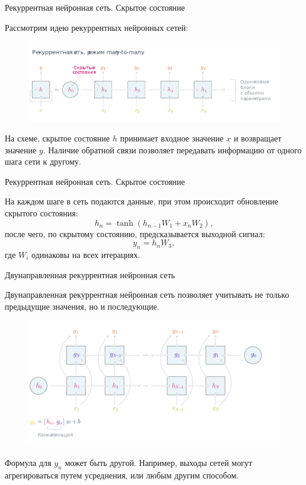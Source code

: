 \documentclass[notheorems, handout, 10pt]{beamer}
\begin{document}
	\begin{frame}{Рекуррентная нейронная сеть. Скрытое состояние}
		
		Рассмотрим идею рекуррентных нейронных сетей:
		
		\begin{figure}[H]
			\includegraphics[width=1\linewidth]{images/3}
		\end{figure}
		
		На схеме, скрытое состояние $h$ принимает входное значение $x$ и возвращает значение $y$. Наличие обратной связи позволяет передавать информацию от одного шага сети к другому.
		
		\note{}
		
	\end{frame}
	\begin{frame}{Рекуррентная нейронная сеть. Скрытое состояние}
	
		На каждом шаге в сеть подаются данные, при этом происходит обновление скрытого состояния: $$h_n = \tanh(h_{n-1}W_1 + x_nW_2),$$ после чего, по скрытому состоянию, предсказывается выходной сигнал: $$y_n=h_nW_3,$$ где $W_i$ одинаковы на всех итерациях.
		
		\note{}
		
	\end{frame}
	
	\begin{frame}{Двунаправленная рекуррентная нейронная сеть}
		
		Двунаправленная рекуррентная нейронная сеть позволяет учитывать не только предыдущие значения, но и последующие.
		
		\begin{figure}[H]
			\includegraphics[width=1\linewidth]{images/4}
		\end{figure}
		
		Формула для $y_n$ может быть другой. Например, выходы сетей могут агрегироваться путем усреднения, или любым другим способом.
		
		\note{}
		
	\end{frame}
	
\end{document}
